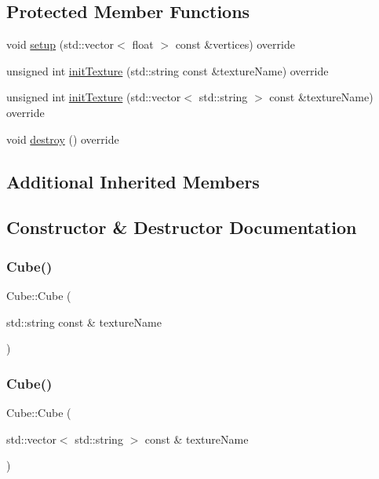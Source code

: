 \subsection*{Protected Member Functions}
\begin{DoxyCompactItemize}
\item 
void \hyperlink{classCube_a107c29684289fcd3be2b1da6d297fe23}{setup} (std\+::vector$<$ float $>$ const \&vertices) override
\item 
unsigned int \hyperlink{classCube_ad4e00146ffacc5d272aa0c501bee4dca}{init\+Texture} (std\+::string const \&texture\+Name) override
\item 
unsigned int \hyperlink{classCube_a9ffa60b8c97c5419277b0ad2f9a3e92e}{init\+Texture} (std\+::vector$<$ std\+::string $>$ const \&texture\+Name) override
\item 
void \hyperlink{classCube_af4873f0863ce7ad4f37e4af154782a27}{destroy} () override
\end{DoxyCompactItemize}
\subsection*{Additional Inherited Members}


\subsection{Constructor \& Destructor Documentation}
\mbox{\label{classCube_a41a92f10d372f9398b34d9d35d3ef720}} 
\subsubsection{\texorpdfstring{Cube()}{Cube()}\hspace{0.1cm}{\footnotesize\ttfamily [1/2]}}
{\footnotesize\ttfamily Cube\+::\+Cube (\begin{DoxyParamCaption}\item[{std\+::string const \&}]{texture\+Name }\end{DoxyParamCaption})}

\mbox{\label{classCube_af45ed13232aae0b1271df4f61726a575}} 
\subsubsection{\texorpdfstring{Cube()}{Cube()}\hspace{0.1cm}{\footnotesize\ttfamily [2/2]}}
{\footnotesize\ttfamily Cube\+::\+Cube (\begin{DoxyParamCaption}\item[{std\+::vector$<$ std\+::string $>$ const \&}]{texture\+Name }\end{DoxyParamCaption})}

